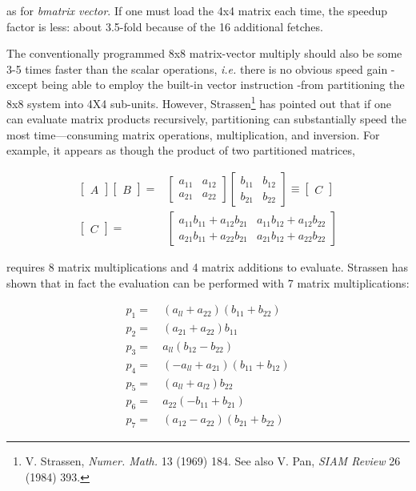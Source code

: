 as for \textit{bmatrix vector}. If one must load the 4x4 matrix each time, the speedup factor is less: about 3.5-fold because of the 16 additional fetches.

The conventionally programmed 8x8 matrix-vector multiply should also be some 3-5 times faster than the scalar operations, \textit{i.e.} there is no obvious speed gain -except being able to employ the built-in vector instruction  -from partitioning the 8x8 system into 4X4 sub-units. However, Strassen\footnote{V. Strassen, \textit{Numer. Math.} 13 (1969) 184. See also V. Pan, \textit{SIAM Review} 26 (1984) 393.} has pointed out that if one can evaluate matrix products recursively, partitioning can substantially speed the most time—consuming matrix operations, multiplication, and inversion. For example, it appears as though the product of two partitioned matrices,

\begin{align}
    \begin{bmatrix}A\end{bmatrix}
    \begin{bmatrix}B\end{bmatrix} =& 
    \begin{bmatrix}
      a_{11} & a_{12} \\
      a_{21} & a_{22}
    \end{bmatrix}
    \begin{bmatrix}
      b_{11} & b_{12} \\
      b_{21} & b_{22}
    \end{bmatrix}
    \equiv
    \begin{bmatrix}C\end{bmatrix} \\
    \begin{bmatrix}C\end{bmatrix} =&
    \begin{bmatrix}
      a_{11}b_{11}+a_{12}b_{21} & a_{11}b_{12}+a_{12}b_{22} \\
      a_{21}b_{11}+a_{22}b_{21} & a_{21}b_{12}+a_{22}b_{22}
    \end{bmatrix}
\end{align}

requires 8 matrix multiplications and 4 matrix additions to evaluate. Strassen has shown that in fact the evaluation can be performed with 7 matrix multiplications:

\begin{align}
    p_{1} =&\ (a_{ll} + a_{22}) (b_{11} + b_{22})  \\
    p_{2} =&\ (a_{21} + a_{22}) b_{11}             \\
    p_{3} =&\ a_{ll} (b_{12} - b_{22})             \\
    p_{4} =&\ (-a_{ll} + a_{21}) (b_{11} + b_{12}) \\
    p_{5} =&\ (a_{ll} + a_{l2}) b_{22}             \\
    p_{6} =&\ a_{22} (-b_{11} + b_{21})            \\
    p_{7} =&\ (a_{12} - a_{22}) (b_{21} + b_{22})
\end{align}

